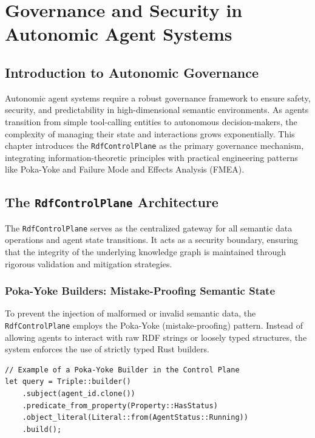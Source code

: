 \chapter{Governance and Security in Autonomic Agent Systems}

\section{Introduction to Autonomic Governance}

Autonomic agent systems require a robust governance framework to ensure safety, security, and predictability in high-dimensional semantic environments. As agents transition from simple tool-calling entities to autonomous decision-makers, the complexity of managing their state and interactions grows exponentially. This chapter introduces the \texttt{RdfControlPlane} as the primary governance mechanism, integrating information-theoretic principles with practical engineering patterns like Poka-Yoke and Failure Mode and Effects Analysis (FMEA).

\section{The \texttt{RdfControlPlane} Architecture}

The \texttt{RdfControlPlane} serves as the centralized gateway for all semantic data operations and agent state transitions. It acts as a security boundary, ensuring that the integrity of the underlying knowledge graph is maintained through rigorous validation and mitigation strategies.

\subsection{Poka-Yoke Builders: Mistake-Proofing Semantic State}

To prevent the injection of malformed or invalid semantic data, the \texttt{RdfControlPlane} employs the Poka-Yoke (mistake-proofing) pattern. Instead of allowing agents to interact with raw RDF strings or loosely typed structures, the system enforces the use of strictly typed Rust builders.

\begin{verbatim}
// Example of a Poka-Yoke Builder in the Control Plane
let query = Triple::builder()
    .subject(agent_id.clone())
    .predicate_from_property(Property::HasStatus)
    .object_literal(Literal::from(AgentStatus::Running))
    .build();
\end{verbatim}

